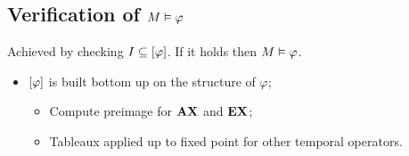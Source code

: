 \subsection{Verification of $M \vDash \varphi$}

Achieved by checking $I \subseteq \left[{\varphi}\right]$. If it holds then $M
\vDash \varphi$.
\begin{itemize}

\item   $\left[{\varphi}\right]$ is built bottom up on the structure of $\varphi$;

    \begin{itemize}

    \item   Compute preimage for $\mathcal{\mathcal{\sf \bf A}}{\mathcal{\sf \bf X}}$ and $\mathcal{\mathcal{\sf \bf E}}{\mathcal{\sf \bf X}}$;

    \item   Tableaux applied up to fixed point for other temporal
            operators.

    \end{itemize}

\end{itemize}

